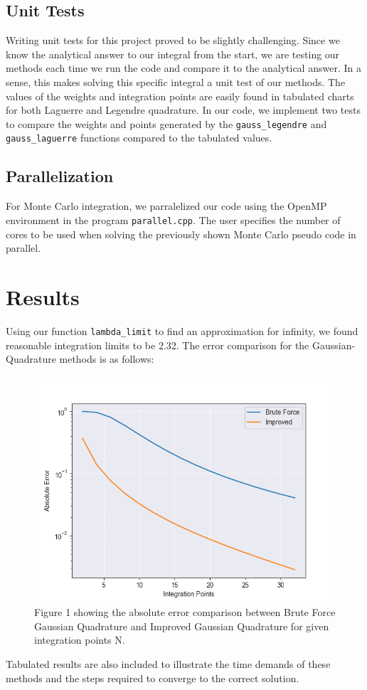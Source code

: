 \documentclass{emulateapj}
\begin{document}
\subsection{Unit Tests}
Writing unit tests for this project proved to be slightly challenging. Since we know  the analytical answer to our integral from the start, we are testing our methods each time we run the code and compare it to the analytical answer. In a sense, this makes solving this specific integral a unit test of our methods. The values of the weights and integration points are easily found in tabulated charts for both Laguerre and Legendre quadrature. In our code, we implement two tests to compare the weights and points generated by the \texttt{gauss\_legendre} and \texttt{gauss\_laguerre} functions compared to the tabulated values.
\subsection{Parallelization}
For Monte Carlo integration, we parralelized our code using the OpenMP environment in the program \texttt{parallel.cpp}. The user specifies the number of cores to be used when solving the previously shown Monte Carlo pseudo code in parallel.
\section{Results}
\label{sec:results}
Using our function \texttt{lambda\_limit} to find an approximation for infinity, we found reasonable integration limits to be 2.32. The error comparison for the Gaussian-Quadrature methods is as follows:
\begin{figure}[H]
    \centering
    \includegraphics[scale=0.5]{quadrature.png}
    \caption{Figure 1 showing the absolute error comparison between Brute Force Gaussian Quadrature and Improved Gaussian Quadrature for given integration points N.}
    \label{fig:fig1}
\end{figure}
Tabulated results are also included to illustrate the time demands of these methods and the steps required to converge to the correct solution.
\end{document}
